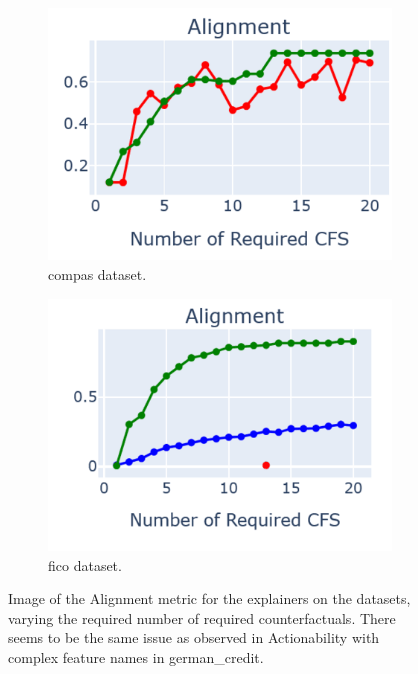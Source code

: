 \begin{figure}[!htbp]
  \begin{subfigure}{0.45\textwidth}
    \centering
    \includegraphics[width=\textwidth]{images/alignment-compas-1.png}
    \caption{compas dataset.}
    \label{fig:image3}
  \end{subfigure}
  \hfill
  \begin{subfigure}{0.45\textwidth}
    \centering
    \includegraphics[width=\textwidth]{images/alignment-fico-1.png}
    \caption{fico dataset.}
    \label{fig:image4}
  \end{subfigure}
  
  \caption{Image of the Alignment metric for the explainers on the datasets, varying the required number of required counterfactuals. There seems to be the same issue as observed in Actionability with complex feature names in german\_credit.}
  \label{fig:four_image_grid}
\end{figure}